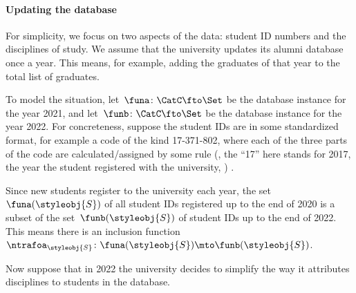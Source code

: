 \paragraph{Updating the database}

For simplicity, we focus on two aspects of the data: student ID numbers and the disciplines of study.
We assume that the university updates its alumni database once a year.
This means, for example, adding the graduates of that year to the total list of graduates.

To model the situation, let~$\funa \colon \CatC \fto \Set$ be the database instance for the year 2021, and let~$\funb \colon \CatC \fto \Set$ be the database instance for the year 2022.
For concreteness,  suppose the student IDs are in some standardized format, for example a code of the kind 17-371-802, where each of the three parts of the code are calculated/assigned by some rule (, the ``17'' here stands for 2017, the year the student registered with the university, \etc)
.

Since new students register to the university each year, the set~$\funa(\styleobj{S})$ of all student IDs registered up to the end of 2020 is a subset of the set~$\funb(\styleobj{S})$ of student IDs up to the end of 2022.
This means there is an inclusion function~$\ntrafoa_{\styleobj{S}} \colon  \funa(\styleobj{S}) \mto \funb(\styleobj{S})$.

Now suppose that in 2022 the university decides to simplify the way it attributes disciplines to students in the database.

